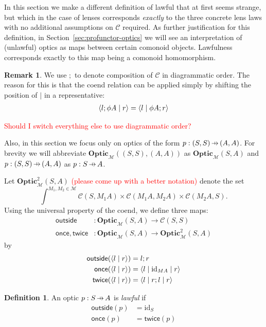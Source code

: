 \documentclass[11pt,letterpaper]{article}
\theoremstyle{plain}
\theoremstyle{definition}
\newtheorem{definition}[theorem]{Definition}
\newtheorem{remark}[theorem]{Remark}
\newcommand{\C}{\mathscr{C}}
\newcommand{\M}{\mathscr{M}}
\newcommand{\Optic}{\mathbf{Optic}}
\newcommand{\Twoptic}{\mathbf{Optic}^2}
\newcommand{\id}{\mathrm{id}}
\newcommand{\rep}[2]{{\ensuremath \left\langle #1 \mid #2 \right\rangle}}
\newcommand{\repthree}[3]{{\ensuremath \langle #1 \mid #2 \mid #3 \rangle}}
\newcommand{\outside}{\mathsf{outside}}
\newcommand{\once}{\mathsf{once}}
\newcommand{\twice}{\mathsf{twice}}
\newcommand{\hto}{\ensuremath{\,\mathaccent\shortmid\rightarrow\,}}
\newcommand{\todo}[1]{\textcolor{red}{\small #1}}
\begin{document}
In this section we make a different definition of lawful that at first seems strange, but which in the case of lenses corresponds \emph{exactly} to the three concrete lens laws with no additional assumptions on $\C$ required. As further justification for this definition, in Section~\ref{sec:profunctor-optics} we will see an interpretation of (unlawful) optics as maps between certain comonoid objects. Lawfulness corresponds exactly to this map being a comonoid homomorphism.

\begin{remark}
We use $;$ to denote composition of $\C$ in diagrammatic order. The reason for this is that the coend relation can be applied simply by shifting the position of $\mid$ in a representative:
\begin{align*}
\rep{l;\phi A}{r} = \rep{l}{\phi A;r}
\end{align*}

\todo{Should I switch everything else to use diagrammatic order?}

  Also, in this section we focus only on optics of the form $p : (S,S) \hto (A, A)$. For brevity we will abbreviate $\Optic_\M((S, S), (A, A))$ as $\Optic_\M(S, A)$ and $p : (S, S) \hto (A, A)$ as $p : S \hto A$.
\end{remark}

Let $\Twoptic_\M(S, A)$ \todo{(please come up with a better notation)} denote the set \[ \int^{M_1, M_2 \in \M} \C(S, M_1 A) \times \C(M_1 A, M_2 A) \times \C(M_2 A, S). \]
Using the universal property of the coend, we define three maps:
\begin{align*}
  \outside &: \Optic_\M(S, A) \to \C(S, S) \\
  \once, \twice &: \Optic_\M(S, A) \to \Twoptic_\M(S, A)
\end{align*}
by
\begin{align*}
  \outside(\rep{l}{r}) &= l;r \\
  \once(\rep{l}{r}) &= \repthree{l}{\id_{MA}}{r} \\
  \twice(\rep{l}{r}) &= \repthree{l}{r;l}{r}
\end{align*}

\begin{definition}
  An optic $p : S \hto A$ is \emph{lawful} if
  \begin{align*}
    \outside(p) &= \id_S \\
    \once(p) &= \twice(p)
  \end{align*}
\end{definition}
\end{document}
